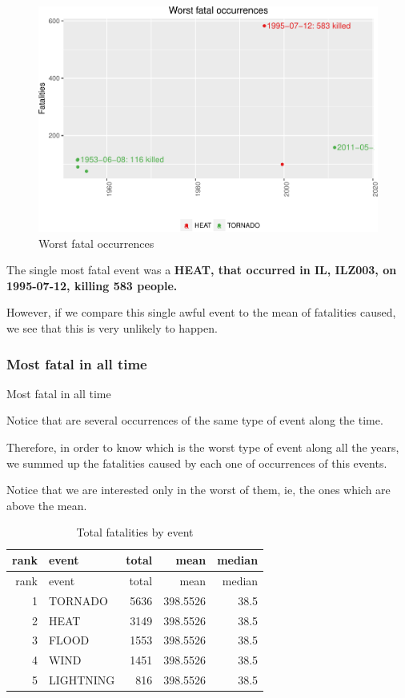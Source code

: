 \documentclass[]{article}
\begin{document}
\begin{figure}[htbp]
\centering
\includegraphics{readme_files/figure-latex/fatal-plot-single-1.pdf}
\caption{Worst fatal occurrences}
\end{figure}

The single most fatal event was a \textbf{HEAT, that occurred in IL,
ILZ003, on 1995-07-12, killing 583 people.}

However, if we compare this single awful event to the mean of fatalities
caused, we see that this is very unlikely to happen.

\subsubsection{Most fatal in all time}\label{most-fatal-in-all-time}

Most fatal in all time

Notice that are several occurrences of the same type of event along the
time.

Therefore, in order to know which is the worst type of event along all
the years, we summed up the fatalities caused by each one of occurrences
of this events.

Notice that we are interested only in the worst of them, ie, the ones
which are above the mean.

\begin{longtable}[]{@{}rlrrr@{}}
\caption{Total fatalities by event}\tabularnewline
\toprule
rank & event & total & mean & median\tabularnewline
\midrule
\endfirsthead
\toprule
rank & event & total & mean & median\tabularnewline
\midrule
\endhead
1 & TORNADO & 5636 & 398.5526 & 38.5\tabularnewline
2 & HEAT & 3149 & 398.5526 & 38.5\tabularnewline
3 & FLOOD & 1553 & 398.5526 & 38.5\tabularnewline
4 & WIND & 1451 & 398.5526 & 38.5\tabularnewline
5 & LIGHTNING & 816 & 398.5526 & 38.5\tabularnewline
\bottomrule
\end{longtable}
\end{document}
